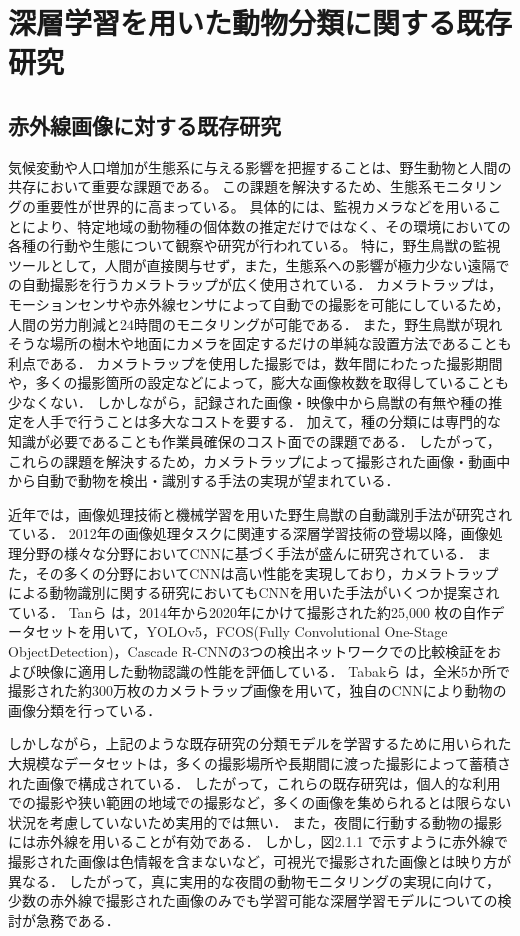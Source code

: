 \documentclass[a4paper,11pt,nomag]{jsreport}
\begin{document}
\setcounter{chapter}{2}

\chapter*{深層学習を用いた動物分類に関する既存研究}

\section{赤外線画像に対する既存研究}

気候変動や人口増加が生態系に与える影響を把握することは、野生動物と人間の共存において重要な課題である。
この課題を解決するため、生態系モニタリングの重要性が世界的に高まっている。
具体的には、監視カメラなどを用いることにより、特定地域の動物種の個体数の推定だけではなく、その環境においての各種の行動や生態について観察や研究が行われている。
特に，野生鳥獣の監視ツールとして，人間が直接関与せず，また，生態系への影響が極力少ない遠隔での自動撮影を行うカメラトラップが広く使用されている．
カメラトラップは，モーションセンサや赤外線センサによって自動での撮影を可能にしているため，人間の労力削減と24時間のモニタリングが可能である．
また，野生鳥獣が現れそうな場所の樹木や地面にカメラを固定するだけの単純な設置方法であることも利点である．
カメラトラップを使用した撮影では，数年間にわたった撮影期間や，多くの撮影箇所の設定などによって，膨大な画像枚数を取得していることも少なくない．
しかしながら，記録された画像・映像中から鳥獣の有無や種の推定を人手で行うことは多大なコストを要する．
加えて，種の分類には専門的な知識が必要であることも作業員確保のコスト面での課題である．
したがって，これらの課題を解決するため，カメラトラップによって撮影された画像・動画中から自動で動物を検出・識別する手法の実現が望まれている．

近年では，画像処理技術と機械学習を用いた野生鳥獣の自動識別手法が研究されている．
2012年の画像処理タスクに関連する深層学習技術の登場以降，画像処理分野の様々な分野においてCNNに基づく手法が盛んに研究されている．
また，その多くの分野においてCNNは高い性能を実現しており，カメラトラップによる動物識別に関する研究においてもCNNを用いた手法がいくつか提案されている．
Tanら \cite{tan2022}は，2014年から2020年にかけて撮影された約25,000 枚の自作データセットを用いて，YOLOv5，FCOS(Fully Convolutional One-Stage ObjectDetection)，Cascade R-CNNの3つの検出ネットワークでの比較検証をおよび映像に適用した動物認識の性能を評価している．
Tabakら \cite{tabak2019}は，全米5か所で撮影された約300万枚のカメラトラップ画像を用いて，独自のCNNにより動物の画像分類を行っている．

しかしながら，上記のような既存研究の分類モデルを学習するために用いられた大規模なデータセットは，多くの撮影場所や長期間に渡った撮影によって蓄積された画像で構成されている．
したがって，これらの既存研究は，個人的な利用での撮影や狭い範囲の地域での撮影など，多くの画像を集められるとは限らない状況を考慮していないため実用的では無い．
また，夜間に行動する動物の撮影には赤外線を用いることが有効である．
しかし，図2.1.1 で示すように赤外線で撮影された画像は色情報を含まないなど，可視光で撮影された画像とは映り方が異なる．
したがって，真に実用的な夜間の動物モニタリングの実現に向けて，少数の赤外線で撮影された画像のみでも学習可能な深層学習モデルについての検討が急務である．
\end{document}
